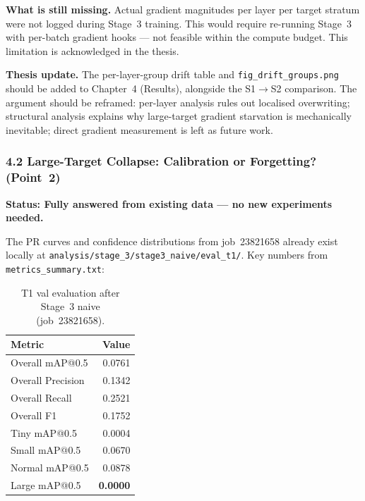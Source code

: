 \vspace{0.5em}
\noindent\textbf{What is still missing.} Actual gradient magnitudes per layer per
target stratum were not logged during Stage~3 training. This would require
re-running Stage~3 with per-batch gradient hooks --- not feasible within the
compute budget. This limitation is acknowledged in the thesis.

\vspace{0.5em}
\noindent\textbf{Thesis update.} The per-layer-group drift table and
\texttt{fig\_drift\_groups.png} should be added to Chapter~4 (Results),
alongside the S1$\to$S2 comparison. The argument should be reframed:
per-layer analysis rules out localised overwriting; structural analysis
explains why large-target gradient starvation is mechanically inevitable;
direct gradient measurement is left as future work.

\subsubsection*{4.2 Large-Target Collapse: Calibration or Forgetting? (Point~2)}

\textbf{Status: Fully answered from existing data --- no new experiments needed.}

\vspace{0.5em}
\noindent The PR curves and confidence distributions from job~23821658 already
exist locally at \texttt{analysis/stage\_3/stage3\_naive/eval\_t1/}. Key numbers
from \texttt{metrics\_summary.txt}:

\begin{table}[h]
\centering
\caption{T1 val evaluation after Stage~3 naive (job~23821658).}
\small
\begin{tabular}{lr}
\hline
\textbf{Metric} & \textbf{Value} \\
\hline
Overall mAP@0.5          & 0.0761 \\
Overall Precision        & 0.1342 \\
Overall Recall           & 0.2521 \\
Overall F1               & 0.1752 \\
Tiny mAP@0.5             & 0.0004 \\
Small mAP@0.5            & 0.0670 \\
Normal mAP@0.5           & 0.0878 \\
Large mAP@0.5            & \textbf{0.0000} \\
\hline
\end{tabular}
\end{table}

